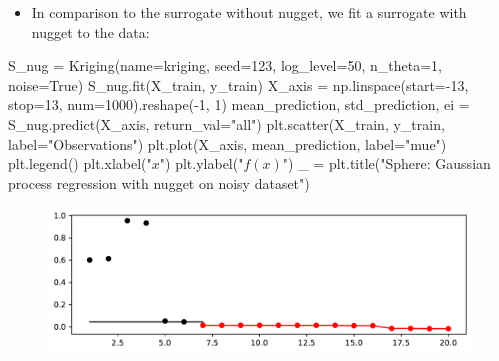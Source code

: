 \documentclass[
  letterpaper,
  DIV=11,
  numbers=noendperiod]{scrreprt}
\newenvironment{Shaded}{\begin{snugshade}}{\end{snugshade}}
\newcommand{\DecValTok}[1]{\textcolor[rgb]{0.68,0.00,0.00}{#1}}
\newcommand{\NormalTok}[1]{\textcolor[rgb]{0.00,0.23,0.31}{#1}}
\newcommand{\OperatorTok}[1]{\textcolor[rgb]{0.37,0.37,0.37}{#1}}
\newcommand{\StringTok}[1]{\textcolor[rgb]{0.13,0.47,0.30}{#1}}
\newcommand{\VariableTok}[1]{\textcolor[rgb]{0.07,0.07,0.07}{#1}}
\providecommand{\tightlist}{%
  \setlength{\itemsep}{0pt}\setlength{\parskip}{0pt}}\usepackage{longtable,booktabs,array}
\begin{document}
\begin{itemize}
\tightlist
\item
  In comparison to the surrogate without nugget, we fit a surrogate with
  nugget to the data:
\end{itemize}

\begin{Shaded}
\begin{Highlighting}[]
\NormalTok{S\_nug }\OperatorTok{=}\NormalTok{ Kriging(name}\OperatorTok{=}\StringTok{\textquotesingle{}kriging\textquotesingle{}}\NormalTok{,}
\NormalTok{            seed}\OperatorTok{=}\DecValTok{123}\NormalTok{,}
\NormalTok{            log\_level}\OperatorTok{=}\DecValTok{50}\NormalTok{,}
\NormalTok{            n\_theta}\OperatorTok{=}\DecValTok{1}\NormalTok{,}
\NormalTok{            noise}\OperatorTok{=}\VariableTok{True}\NormalTok{)}
\NormalTok{S\_nug.fit(X\_train, y\_train)}
\NormalTok{X\_axis }\OperatorTok{=}\NormalTok{ np.linspace(start}\OperatorTok{={-}}\DecValTok{13}\NormalTok{, stop}\OperatorTok{=}\DecValTok{13}\NormalTok{, num}\OperatorTok{=}\DecValTok{1000}\NormalTok{).reshape(}\OperatorTok{{-}}\DecValTok{1}\NormalTok{, }\DecValTok{1}\NormalTok{)}
\NormalTok{mean\_prediction, std\_prediction, ei }\OperatorTok{=}\NormalTok{ S\_nug.predict(X\_axis, return\_val}\OperatorTok{=}\StringTok{"all"}\NormalTok{)}
\NormalTok{plt.scatter(X\_train, y\_train, label}\OperatorTok{=}\StringTok{"Observations"}\NormalTok{)}
\NormalTok{plt.plot(X\_axis, mean\_prediction, label}\OperatorTok{=}\StringTok{"mue"}\NormalTok{)}
\NormalTok{plt.legend()}
\NormalTok{plt.xlabel(}\StringTok{"$x$"}\NormalTok{)}
\NormalTok{plt.ylabel(}\StringTok{"$f(x)$"}\NormalTok{)}
\NormalTok{\_ }\OperatorTok{=}\NormalTok{ plt.title(}\StringTok{"Sphere: Gaussian process regression with nugget on noisy dataset"}\NormalTok{)}
\end{Highlighting}
\end{Shaded}

\begin{figure}[H]

{\centering \includegraphics{013_num_spot_noisy_files/figure-pdf/cell-11-output-1.pdf}

}

\end{figure}
\end{document}
